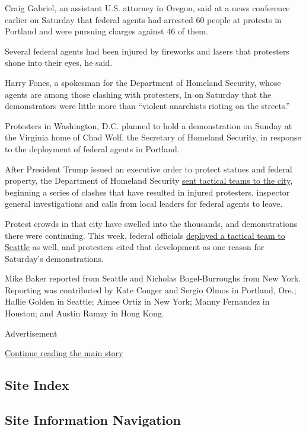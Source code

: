 Craig Gabriel, an assistant U.S. attorney in Oregon, said at a news
conference earlier on Saturday that federal agents had arrested 60
people at protests in Portland and were pursuing charges against 46 of
them.

Several federal agents had been injured by fireworks and lasers that
protesters shone into their eyes, he said.

Harry Fones, a spokesman for the Department of Homeland Security, whose
agents are among those clashing with protesters, In on Saturday that the
demonstrators were little more than ``violent anarchists rioting on the
streets.''

Protesters in Washington, D.C. planned to hold a demonstration on Sunday
at the Virginia home of Chad Wolf, the Secretary of Homeland Security,
in response to the deployment of federal agents in Portland.

After President Trump issued an executive order to protect statues and
federal property, the Department of Homeland Security
\href{https://www.nytimes.com/2020/07/25/us/portland-federal-legal-jurisdiction-courts.html}{sent
tactical teams to the city}, beginning a series of clashes that have
resulted in injured protesters, inspector general investigations and
calls from local leaders for federal agents to leave.

Protest crowds in that city have swelled into the thousands, and
demonstrations there were continuing. This week, federal officials
\href{https://www.nytimes.com/2020/07/23/us/seattle-protests-feds.html}{deployed
a tactical team to Seattle} as well, and protesters cited that
development as one reason for Saturday's demonstrations.

Mike Baker reported from Seattle and Nicholas Bogel-Burroughs from New
York. Reporting was contributed by Kate Conger and Sergio Olmos in
Portland, Ore.; Hallie Golden in Seattle; Aimee Ortiz in New York; Manny
Fernandez in Houston; and Austin Ramzy in Hong Kong.

Advertisement

\protect\hyperlink{after-bottom}{Continue reading the main story}

\hypertarget{site-index}{%
\subsection{Site Index}\label{site-index}}

\hypertarget{site-information-navigation}{%
\subsection{Site Information
Navigation}\label{site-information-navigation}}

